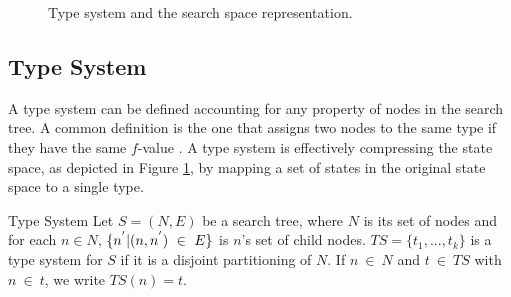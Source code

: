 \begin{figure}[htb]
\caption{Type system and the search space representation.} \label{fig:ss_ts}
\end{figure}

\subsection{Type System}
A type system can be defined accounting for any property of nodes in the search tree. A common definition is the one that assigns two nodes to the same type if they have the same $f$-value \cite{lelis2013predicting}. A type system is effectively compressing the state space, as depicted in Figure \ref{fig:ss_ts}, by mapping a set of states in the original state space to a single type.  

\begin{definition}{Type System}
Let $S = (N,E)$ be a search tree, where $N$ is its set of nodes and for each $n \in N$, $\{n\sp{'}|(n,n\sp{'})\ \in\ E \}$ is $n$'s set of child nodes. $TS = \{t_{1},...,t_{k} \}$ is a type system for $S$ if it is a disjoint partitioning of $N$. If $n\ \in\ N$ and $t\ \in\ TS$ with $n\ \in\ t$, we write $TS(n) = t$.
\end{definition}


